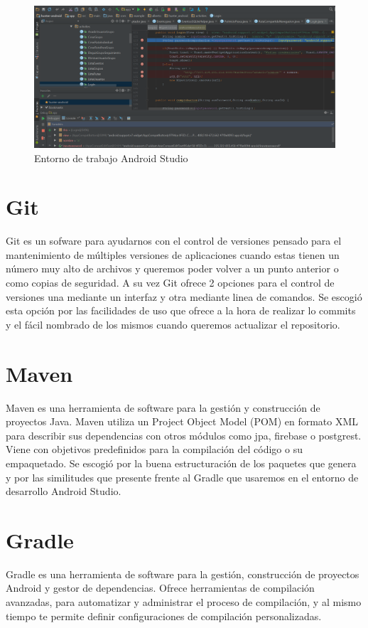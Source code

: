 \begin{figure}[H]
		\centering
		\includegraphics[width=\textwidth] {debug.png}
		\caption{Entorno de trabajo Android Studio }
		\label{fig:debug}
	\end{figure}


\section{Git}
Git es un sofware para ayudarnos con el control de versiones  pensado para el mantenimiento de múltiples versiones de aplicaciones cuando estas tienen un número muy alto de archivos y queremos poder volver a un punto anterior o como copias de seguridad. A su vez Git ofrece 2 opciones para el control de versiones una mediante un interfaz y otra mediante linea de comandos. Se escogió esta opción por las facilidades de uso que ofrece a la hora de realizar lo commits y el fácil nombrado de los mismos cuando queremos actualizar el repositorio.
\section{Maven}
Maven es una herramienta de software para la gestión y construcción de proyectos Java.
 Maven utiliza un Project Object Model (POM) en formato
XML para describir sus dependencias con otros módulos como jpa, firebase o postgrest. Viene con objetivos predefinidos para la compilación del código o su empaquetado. Se escogió por la buena estructuración de los paquetes que genera y por las similitudes que presente frente al Gradle que usaremos en el entorno de desarrollo Android Studio.




\section{Gradle}
Gradle es una herramienta de software para la gestión, construcción de proyectos Android y gestor de dependencias. Ofrece
  herramientas de compilación avanzadas, para automatizar y administrar el proceso de compilación, y al mismo tiempo te permite definir configuraciones de compilación personalizadas.



